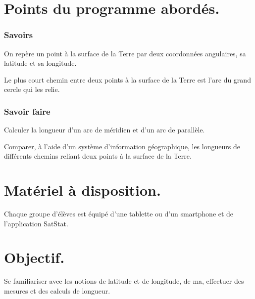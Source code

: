 \documentclass[12pt,a4paper,notitlepage,twoside]{article}
\begin{document}
\section*{Points du programme abordés.}
\begin{multicols}{2}
\subsubsection*{Savoirs}
On repère un point à la surface de la Terre par deux coordonnées angulaires, sa latitude et sa longitude.

Le plus court chemin entre deux points à la surface de la Terre est l’arc du grand cercle qui les relie.
\columnbreak

\subsubsection*{Savoir faire}
Calculer la longueur d’un arc de méridien et d’un arc de parallèle.

Comparer, à l’aide d’un système d’information géographique, les longueurs de différents chemins reliant deux points à la surface de la Terre.
\end{multicols}

\section*{Matériel à disposition.}
Chaque groupe d'élèves est équipé d'une tablette ou d'un smartphone et de l'application SatStat.

\section*{Objectif.}
Se familiariser avec les notions de latitude et de longitude, de ma, effectuer des mesures et des calculs de longueur.

\newpage
\vfill
\end{document}
